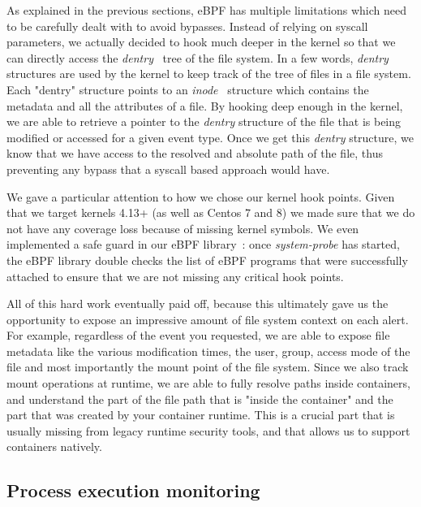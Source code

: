 As explained in the previous sections, eBPF has multiple limitations which need to be carefully dealt with to avoid bypasses.
Instead of relying on syscall parameters, we actually decided to hook much deeper in the kernel so that we can directly access the \emph{dentry}~\cite{RuntimeSecurityMonitoringWithEBPF:Dentry} tree of the file system.
In a few words, \emph{dentry} structures are used by the kernel to keep track of the tree of files in a file system.
Each "dentry" structure points to an \emph{inode}~\cite{RuntimeSecurityMonitoringWithEBPF:Inode} structure which contains the metadata and all the attributes of a file.
By hooking deep enough in the kernel, we are able to retrieve a pointer to the \emph{dentry} structure of the file that is being modified or accessed for a given event type.
Once we get this \emph{dentry} structure, we know that we have access to the resolved and absolute path of the file, thus preventing any bypass that a syscall based approach would have.

We gave a particular attention to how we chose our kernel hook points.
Given that we target kernels 4.13+ (as well as Centos 7 and 8) we made sure that we do not have any coverage loss because of missing kernel symbols.
We even implemented a safe guard in our eBPF library~\cite{RuntimeSecurityMonitoringWithEBPF:DatadogEBPFLib}: once \emph{system-probe} has started, the eBPF library double checks the list of eBPF programs that were successfully attached to ensure that we are not missing any critical hook points.

All of this hard work eventually paid off, because this ultimately gave us the opportunity to expose an impressive amount of file system context on each alert.
For example, regardless of the event you requested, we are able to expose file metadata like the various modification times, the user, group, access mode of the file and most importantly the mount point of the file system.
Since we also track mount operations at runtime, we are able to fully resolve paths inside containers, and understand the part of the file path that is "inside the container" and the part that was created by your container runtime.
This is a crucial part that is usually missing from legacy runtime security tools, and that allows us to support containers natively.

\subsection{Process execution monitoring}

